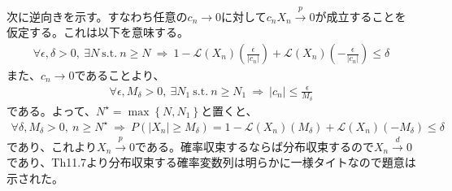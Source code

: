 \documentclass{article}
\begin{document}
\noindent
次に逆向きを示す。すなわち任意の$c_n \to 0$に対して$c_n X_n \xrightarrow{p} 0$が成立することを仮定する。これは以下を意味する。
\begin{align*}
	\forall \epsilon , \delta > 0,\ \exists N\ \text{s.t.}\ n\geq N\ \Rightarrow\ 1-\mathcal{L}(X_n)\left( \frac{\epsilon}{\left| c_n \right|} \right) + \mathcal{L}(X_n)\left( -\frac{\epsilon}{\left| c_n \right|} \right) \leq \delta
\end{align*}
また、$c_n\to 0$であることより、
\begin{align*}
	\forall \epsilon , M_{\delta} > 0, \ \exists N_1\ \text{s.t.}\ n\geq N_1\ \Rightarrow\ \left| c_n \right| \leq \frac{\epsilon}{M_{\delta}}
\end{align*}
である。よって、$N^{\star} = \max\left\{ N, N_1 \right\}$と置くと、
\begin{align*}
	\forall \delta, M_{\delta} > 0, \  n\geq N^{\star} \ \Rightarrow\ P\left( \left| X_n \right| \geq M_{\delta} \right) = 1-\mathcal{L}(X_n)\left( M_{\delta} \right) + \mathcal{L}(X_n)\left(- M_{\delta} \right) \leq \delta
\end{align*}
であり、これより$X_n\xrightarrow{p}0$である。確率収束するならば分布収束するので$X_n\xrightarrow{d}0$であり、Th11.7より分布収束する確率変数列は明らかに一様タイトなので題意は示された。
\end{document}
